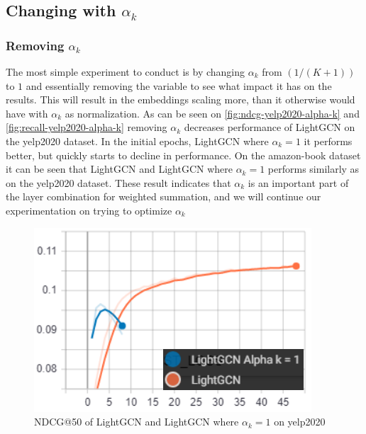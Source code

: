 \subsection{Changing with $\alpha_k$}

\subsubsection{Removing $\alpha_k$}\label{subsubsec:remove-alpha-k}
The most simple experiment to conduct is by changing $\alpha_k$ from $(1 / (K + 1))$ to $1$ and essentially removing the variable to see what impact it has on the results.
This will result in the embeddings scaling more, than it otherwise would have with $\alpha_k$ as normalization.
As can be seen on \autoref{fig:ndcg-yelp2020-alpha-k} and \autoref{fig:recall-yelp2020-alpha-k} removing $\alpha_k$ decreases performance of LightGCN on the yelp2020 dataset.
In the initial epochs, LightGCN where $\alpha_k = 1$ it performs better, but quickly starts to decline in performance.
On the amazon-book dataset it can be seen that LightGCN and LightGCN where $\alpha_k = 1$ performs similarly as on the yelp2020 dataset.
These result indicates that $\alpha_k$ is an important part of the layer combination for weighted summation, and we will continue our experimentation on trying to optimize $\alpha_k$
\begin{figure}
    \includegraphics[width=\linewidth]{figures/alpha-k-results/yelp2020-ndcg.png}
    \caption{NDCG@50 of LightGCN and LightGCN where $\alpha_k = 1$ on yelp2020}
    \label{fig:ndcg-yelp2020-alpha-k}
\end{figure}
